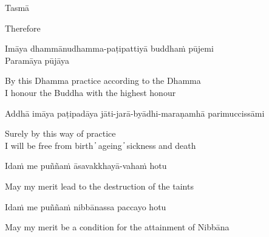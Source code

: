 \suttaRef{[DN 16]}

Tasmā

\begin{cprenglish}
  Therefore
\end{cprenglish}

Imāya dhammānudhamma-paṭipattiyā buddhaṁ pūjemi\\
Paramāya pūjāya

\begin{cprenglish}
  By this Dhamma practice according to the Dhamma\\
  I honour the Buddha with the highest honour
\end{cprenglish}

Addhā imāya paṭipadāya jāti-jarā-byādhi-maraṇamhā parimuccissāmi

\begin{cprenglish}
  Surely by this way of practice\\
  I will be free from birth  ̓  ageing  ̓  sickness and death
\end{cprenglish}

Idaṁ me puññaṁ āsavakkhayā-vahaṁ hotu

\begin{cprenglish}
  May my merit lead to the destruction of the taints
\end{cprenglish}

Idaṁ me puññaṁ nibbānassa paccayo hotu

\begin{cprenglish}
  May my merit be a condition for the attainment of Nibbāna
\end{cprenglish}


\clearpage
